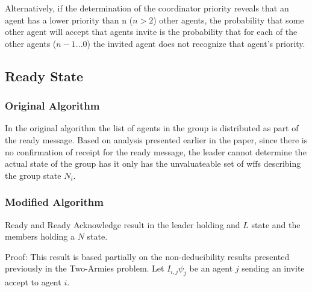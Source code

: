 Alternatively, if the determination of the coordinator priority reveals that an agent has a lower priority than n ($n > 2$) other agents, the probability that some other agent will accept that agents invite is the probability that for each of the other agents ($n-1 ... 0$) the invited agent does not recognize that agent's priority.

\subsection{Ready State}

\subsubsection{Original Algorithm}

In the original algorithm the list of agents in the group is distributed as part of the ready message. Based on analysis presented earlier in the paper, since there is no confirmation of receipt for the ready message, the leader cannot determine the actual state of the group has it only has the unvaluateable set of wffs describing the group state $N_i$.

\subsubsection{Modified Algorithm}

\begin{thm}
Ready and Ready Acknowledge result in the leader holding and $L$ state and the members holding a $N$ state.
\end{thm}

Proof: This result is based partially on the non-deducibility results presented previously in the Two-Armies problem. Let $I_{i,j} \psi_j$ be an agent $j$ sending an invite accept to agent $i$.

